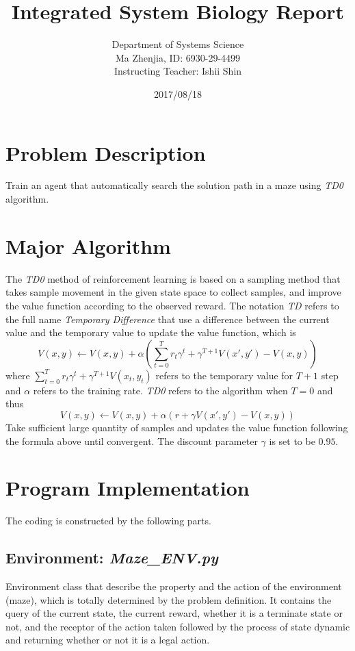 \documentclass{article}
\title{\Large Integrated System Biology Report}
\author{Department of Systems Science \\ Ma Zhenjia, ID: 6930-29-4499 \\ 
	Instructing Teacher: Ishii Shin}
\date{2017/08/18}
\begin{document}
	\maketitle
	
	\section{Problem Description}
		Train an agent that automatically search the solution path in a maze
		using \textit{TD0} algorithm.
			
	\section{Major Algorithm}
		The \textit{TD0} method of reinforcement learning is based on a sampling method
		that takes sample movement in the given state space to collect samples, and 
		improve the value function according to the observed reward.
		The notation \textit{TD} refers to the full name \textit{Temporary Difference} that
		use a difference between the current value and the temporary value to 
		update the value function, which is
		\[
			V(x, y) \leftarrow V(x, y) + \alpha(\sum_{t=0}^Tr_t\gamma^t+\gamma^{T+1}V(x', y')
				- V(x, y))
		\]
		where $\sum_{t=0}^Tr_t\gamma^t+\gamma^{T+1}V(x_t, y_t)$ refers to the temporary
		value for $T+1$ step and $\alpha$ refers to the training rate.
		\textit{TD0} refers to the algorithm when $T=0$ and thus
		\[
			V(x, y) \leftarrow V(x, y) + \alpha(r+\gamma V(x', y')
				- V(x, y))
		\]
		Take sufficient large quantity of samples and updates the value function following the 
		formula above until convergent. The discount parameter $\gamma$ is set to be $0.95$.
	
	\section{Program Implementation}
		The coding is constructed by the following parts.
		\subsection{Environment: \textit{Maze\_ENV.py}}
			Environment class that describe the property and the action of the environment (maze),
			which is totally determined by the problem definition.
			It contains the query of the current state, the current reward, whether it is a terminate
			state or not, and the receptor of the action taken followed by the process
			of state dynamic and returning whether or not it is a legal action.
\end{document}
